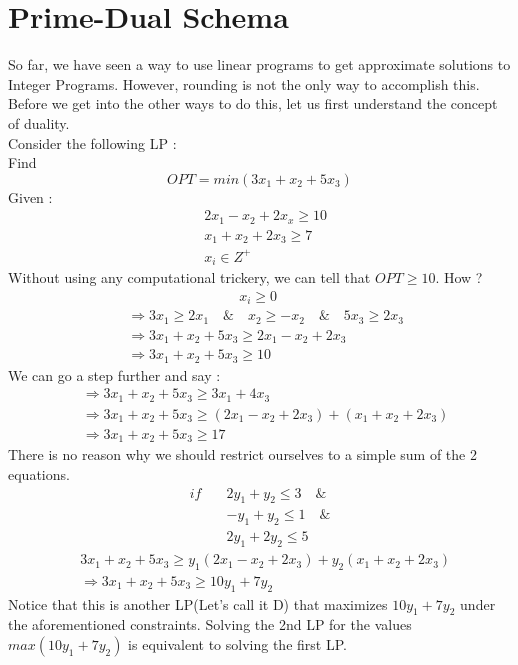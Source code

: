 \documentclass[12pt]{report}
\begin{document}
\chapter{Prime-Dual Schema}
So far, we have seen a way to use linear programs to get approximate solutions to Integer Programs. However, rounding is not the only way to accomplish this. Before we get into the other ways to do this, let us first understand the concept of duality.\\
Consider the following LP :\\
Find \begin{equation*}
OPT = min(3x_1 + x_2 + 5x_3)
\end{equation*}
Given :
\begin{align*}
&2x_1 - x_2 + 2x_x \geq 10 \\
&x_1 + x_2 + 2x_3 \geq 7 \\
&x_i \in Z^+
\end{align*} 
Without using any computational trickery, we can tell that $OPT \geq 10$. How ?
\begin{align*}
&\quad\quad\quad\quad\quad\quad\quad\quad x_i \geq 0 \\
&\Rightarrow 3x_1 \geq 2x_1 \quad \& \quad x_2 \geq -x_2 \quad \& \quad 5x_3 \geq 2x_3 \\
&\Rightarrow 3x_1 + x_2 + 5x_3 \geq 2x_1 - x_2 + 2x_3 \\
&\Rightarrow 3x_1 + x_2 + 5x_3 \geq 10
\end{align*}
We can go a step further and say :
\begin{align*}
&\Rightarrow 3x_1 + x_2 + 5x_3 \geq 3x_1 + 4x_3 \\
&\Rightarrow 3x_1 + x_2 + 5x_3 \geq (2x_1 - x_2 + 2x_3) + (x_1 + x_2 + 2x_3)\\
&\Rightarrow 3x_1 + x_2 + 5x_3 \geq 17
\end{align*}
There is no reason why we should restrict ourselves to a simple sum of the 2 equations.
\begin{align*}
if \quad &2y_1 + y_2 \leq 3 \quad \& \\
&-y_1 + y_2 \leq 1 \quad \& \\
&2y_1 + 2y_2 \leq 5 
\end{align*}\begin{align*}
& 3x_1 + x_2 + 5x_3 \geq y_1(2x_1 - x_2 + 2x_3) + y_2(x_1 + x_2 + 2x_3)\\
&\Rightarrow 3x_1 + x_2 + 5x_3 \geq 10y_1 + 7y_2
\end{align*}
Notice that this is another LP(Let's call it D) that maximizes $10y_1 + 7y_2$ under the aforementioned constraints. Solving the 2nd LP for the values $max(10y_1 + 7y_2)$ is equivalent to solving the first LP.\\
\end{document}
